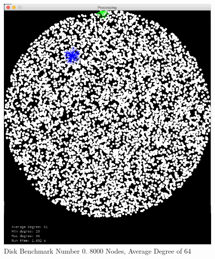 \documentclass{article}
\begin{document}
\begin{center}
    \begin{figure}
        \includegraphics[scale=0.45]{./images/disk_0.png}
        \caption{Disk Benchmark Number 0. 8000 Nodes, Average Degree of 64}
        \label{disk0}
    \end{figure}
\end{center}
\end{document}
